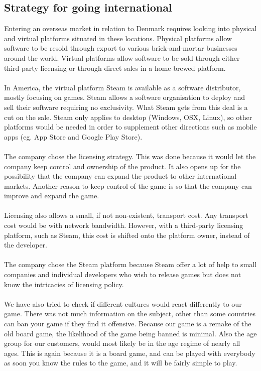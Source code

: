 	\subsection{Strategy for going international}
	Entering an overseas market in relation to Denmark requires looking into
   physical and virtual platforms situated in these locations. Physical
    platforms allow software to be resold through export to various
     brick-and-mortar businesses around the world. Virtual platforms allow
      software to be sold through either third-party licensing or through
       direct sales in a home-brewed platform.
	\\
	\\
	In America, the virtual platform Steam is available as a software
   distributor, mostly focusing on games. Steam allows a software
   organisation to deploy and sell their software requiring no exclusivity.
    What Steam gets from this deal is a cut on the sale. Steam only applies
     to desktop (Windows, OSX, Linux), so other platforms would be needed in
      order to supplement other directions such as mobile
      apps (eg. App Store and Google Play Store).
	\\
	\\
	The company chose the licensing strategy. This was done because it would
   let the company keep control and ownership of the product. It also opens
    up for the possibility that the company can expand the product to other
     international markets. Another reason to keep control of the game is so
      that the company can improve and expand the game.
	\\
	\\
	Licensing also allows a small, if not non-existent, transport cost. Any
   transport cost would be with network bandwidth. However, with a third-party
    licensing platform, such as Steam, this cost is shifted onto the
     platform owner, instead of the developer.
	\\
	\\
	The company chose the Steam platform because Steam offer a lot of help
   to small companies and individual developers who wish to release games
    but does not know the intricacies of licensing policy.
	\\
	\\
	We have also tried to check if different cultures would react differently
   to our game. There was not much information on the subject, other than
   some countries can ban your game if they find it offensive. Because our
   game is a remake of the old board game, the likelihood of the game being
    banned is minimal. Also the age group for our customers, would most
    likely be in the age regime of nearly all ages. This is again because
     it is a board game, and can be played with everybody as soon you know
     the rules to the game, and it will be fairly simple to play.
